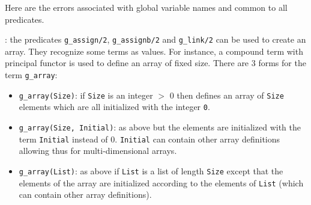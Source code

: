 Here are the errors associated with global variable names and common to all
predicates.

\begin{PlErrorsNoTitle}






\end{PlErrorsNoTitle}

: the predicates \texttt{g\_assign/2}, \texttt{g\_assignb/2}
and \texttt{g\_link/2}  can be used to create an
array. They recognize some terms as values. For instance, a compound term
with principal functor  is used to define an array of fixed
size.  There are 3 forms for the term \texttt{g\_array}:

\begin{itemize}

\item \texttt{g\_array(Size)}: if \texttt{Size} is an integer $>$ 0 then
defines an array of \texttt{Size} elements which are all initialized with
the integer \texttt{0}.

\item \texttt{g\_array(Size, Initial)}: as above but the elements are
initialized with the term \texttt{Initial} instead of 0. \texttt{Initial}
can contain other array definitions allowing thus for multi-dimensional
arrays.

\item \texttt{g\_array(List)}: as above if \texttt{List} is a list of length
\texttt{Size} except that the elements of the array are initialized
according to the elements of \texttt{List} (which can contain other array
definitions).

\end{itemize}

